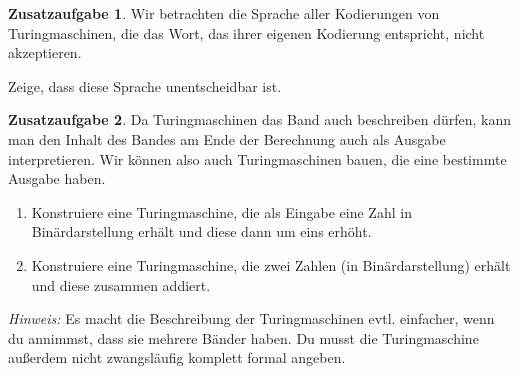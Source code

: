 \documentclass[a4paper,ngerman,12pt]{scrartcl}
\theoremstyle{definition}
\newtheorem{zaufg}{Zusatzaufgabe}
\theoremstyle{plain}
\theoremstyle{remark}
\begin{document}
\begin{zaufg}
	Wir betrachten die Sprache aller Kodierungen von Turingmaschinen, die das Wort, das ihrer eigenen Kodierung entspricht, nicht akzeptieren.
	
	Zeige, dass diese Sprache unentscheidbar ist.
\end{zaufg}

\begin{zaufg}
	Da Turingmaschinen das Band auch beschreiben dürfen, kann man den Inhalt des Bandes am Ende der Berechnung auch als Ausgabe interpretieren. Wir können also auch Turingmaschinen bauen, die eine bestimmte Ausgabe haben.
	\begin{enumerate}[label=\alph*)]
		\item Konstruiere eine Turingmaschine, die als Eingabe eine Zahl in Binärdarstellung erhält und diese dann um eins erhöht.
		\item Konstruiere eine Turingmaschine, die zwei Zahlen (in Binärdarstellung) erhält und diese zusammen addiert.
	\end{enumerate}
	\textit{Hinweis:} Es macht die Beschreibung der Turingmaschinen evtl. einfacher, wenn du annimmst, dass sie mehrere Bänder haben. Du musst die Turingmaschine außerdem nicht zwangsläufig komplett formal angeben.
\end{zaufg}
\end{document}
